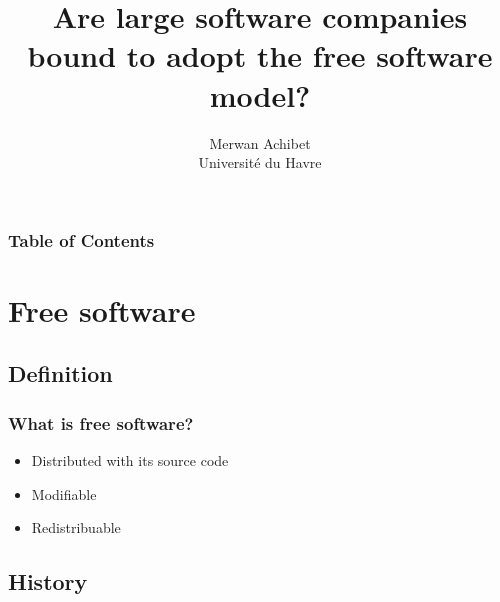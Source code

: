 \documentclass{beamer}
\title{Are large software companies bound to adopt the free software
  model?}
\author{Merwan Achibet\\Université du Havre}
\begin{document}
\maketitle

\begin{frame}
  \frametitle{Table of Contents}
  \tableofcontents
\end{frame}

\section{Free software}

\subsection{Definition}

\begin{frame}

  \frametitle{What is free software?}

  \begin{itemize}
    \item<1->{Distributed with its source code}
    \item<2->{Modifiable}
    \item<3->{Redistribuable}
  \end{itemize}

  \pause

  \vfill


\end{frame}

\subsection{History}
\end{document}
